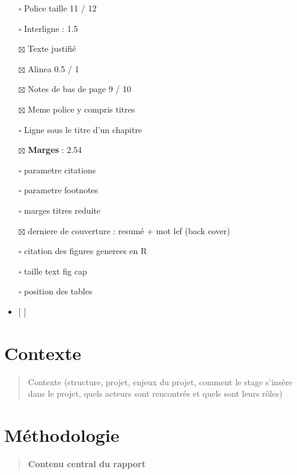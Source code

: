 \documentclass[
  12pt,
  a4paper,
]{scrbook}
\providecommand{\tightlist}{%
  \setlength{\itemsep}{0pt}\setlength{\parskip}{0pt}}\usepackage{longtable,booktabs,array}
\begin{document}
\begin{itemize}
\tightlist
\item[$\square$]
  Police taille 11 / 12
\item[$\square$]
  Interligne : 1.5
\item[$\boxtimes$]
  Texte justifié
\item[$\boxtimes$]
  Alinea 0.5 / 1
\item[$\boxtimes$]
  Notes de bas de page 9 / 10
\item[$\boxtimes$]
  Meme police y compris titres
\item[$\square$]
  Ligne sous le titre d'un chapitre
\item[$\boxtimes$]
  \textbf{Marges} : 2.54
\item[$\square$]
  parametre citations
\item[$\square$]
  parametre footnotes
\item[$\square$]
  marges titres reduite
\item[$\boxtimes$]
  derniere de couverture : resumé + mot lef (back cover)
\item[$\square$]
  citation des figures generees en R
\item[$\square$]
  taille text fig cap
\item[$\square$]
  position des tables
\item
  {[} {]}
\end{itemize}


\hypertarget{contexte}{%
\chapter{Contexte}\label{contexte}}

\begin{quote}
Contexte (structure, projet, enjeux du projet, comment le stage s'insère
dans le projet, quels acteurs sont rencontrés et quels sont leurs rôles)
\end{quote}


\hypertarget{muxe9thodologie-1}{%
\chapter{Méthodologie}\label{muxe9thodologie-1}}

\begin{quote}
\textbf{Contenu central du rapport}
\end{quote}
\end{document}
